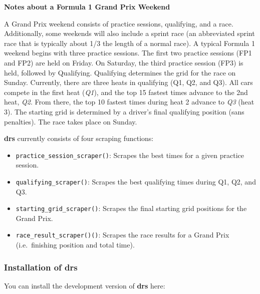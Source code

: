 \documentclass[
]{book}
\providecommand{\tightlist}{%
  \setlength{\itemsep}{0pt}\setlength{\parskip}{0pt}}
\begin{document}
\begin{blackbox}

\begin{center}
\textbf{Notes about a Formula 1 Grand Prix Weekend}

\end{center}

A Grand Prix weekend consists of practice sessions, qualifying, and a race. Additionally, some weekends will also include a sprint race (an abbreviated sprint race that is typically about 1/3 the length of a normal race). A typical Formula 1 weekend begins with three practice sessions. The first two practice sessions (FP1 and FP2) are held on Friday. On Saturday, the third practice session (FP3) is held, followed by Qualifying. Qualifying determines the grid for the race on Sunday. Currently, there are three heats in qualifying (Q1, Q2, and Q3). All cars compete in the first heat (\emph{Q1}), and the top 15 fastest times advance to the 2nd heat, \emph{Q2}. From there, the top 10 fastest times during heat 2 advance to \emph{Q3} (heat 3). The starting grid is determined by a driver's final qualifying position (sans penalties). The race takes place on Sunday.

\end{blackbox}

\textbf{drs} currently consists of four scraping functions:

\begin{itemize}
\tightlist
\item
  \texttt{practice\_session\_scraper()}: Scrapes the best times for a given practice session.
\item
  \texttt{qualifying\_scraper()}: Scrapes the best qualifying times during Q1, Q2, and Q3.
\item
  \texttt{starting\_grid\_scraper()}: Scrapes the final starting grid positions for the Grand Prix.
\item
  \texttt{race\_result\_scraper()()}: Scrapes the race results for a Grand Prix (i.e.~finishing position and total time).
\end{itemize}

\hypertarget{installation-of-drs}{%
\subsubsection{Installation of drs}\label{installation-of-drs}}

You can install the development version of \textbf{drs} here:
\end{document}
